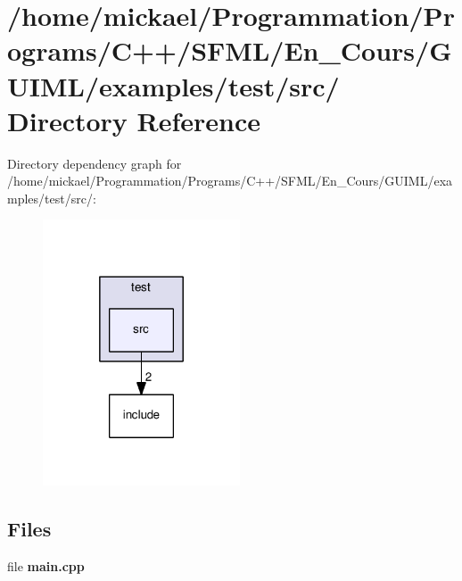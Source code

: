 \section{/home/mickael/\-Programmation/\-Programs/\-C++/\-S\-F\-M\-L/\-En\-\_\-\-Cours/\-G\-U\-I\-M\-L/examples/test/src/ Directory Reference}
\label{dir_1eeaff664fd17807f73eb9e1fa301f14}
Directory dependency graph for /home/mickael/\-Programmation/\-Programs/\-C++/\-S\-F\-M\-L/\-En\-\_\-\-Cours/\-G\-U\-I\-M\-L/examples/test/src/\-:\nopagebreak
\begin{figure}[H]
\begin{center}
\leavevmode
\includegraphics[width=166pt]{dir_1eeaff664fd17807f73eb9e1fa301f14_dep}
\end{center}
\end{figure}
\subsection*{Files}
\begin{DoxyCompactItemize}
\item 
file {\bfseries main.\-cpp}
\end{DoxyCompactItemize}
